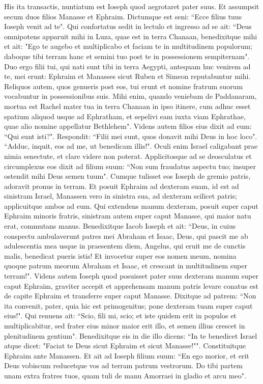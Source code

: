 \begin{biblechapter}  
\verse His ita transactis, nuntiatum est Ioseph quod aegrotaret pater suus. Et assumpsit secum duos filios Manasse et Ephraim. 
\verse Dictumque est seni: “Ecce filius tuus Ioseph venit ad te". Qui confortatus sedit in lectulo 
\verse et ingresso ad se ait: “Deus omnipotens apparuit mihi in Luza, quae est in terra Chanaan, benedixitque mihi 
\verse et ait: "Ego te augebo et multiplicabo et faciam te in multitudinem populorum; daboque tibi terram hanc et semini tuo post te in possessionem sempiternam". 
\verse Duo ergo filii tui, qui nati sunt tibi in terra Aegypti, antequam huc venirem ad te, mei erunt: Ephraim et Manasses sicut Ruben et Simeon reputabuntur mihi. 
\verse Reliquos autem, quos genueris post eos, tui erunt et nomine fratrum suorum vocabuntur in possessionibus suis. 
\verse Mihi enim, quando veniebam de Paddanaram, mortua est Rachel mater tua in terra Chanaan in ipso itinere, cum adhuc esset spatium aliquod usque ad Ephratham, et sepelivi eam iuxta viam Ephrathae, quae alio nomine appellatur Bethlehem". 
\verse Videns autem filios eius dixit ad eum: “Qui sunt isti?". 
\verse Respondit: “Filii mei sunt, quos donavit mihi Deus in hoc loco". “Adduc, inquit, eos ad me, ut benedicam illis!". 
\verse Oculi enim Israel caligabant prae nimia senectute, et clare videre non poterat. Applicitosque ad se deosculatus et circumplexus eos 
\verse dixit ad filium suum: “Non sum fraudatus aspectu tuo; insuper ostendit mihi Deus semen tuum". 
\verse Cumque tulisset eos Ioseph de gremio patris, adoravit pronus in terram. 
\verse Et posuit Ephraim ad dexteram suam, id est ad sinistram Israel, Manassen vero in sinistra sua, ad dexteram scilicet patris; applicuitque ambos ad eum. 
\verse Qui extendens manum dexteram, posuit super caput Ephraim minoris fratris, sinistram autem super caput Manasse, qui maior natu erat, commutans manus. 
\verse Benedixitque Iacob Ioseph et ait: “Deus, in cuius conspectu ambulaverunt patres mei Abraham et Isaac, Deus, qui pascit me ab adulescentia mea usque in praesentem diem, 
\verse Angelus, qui eruit me de cunctis malis, benedicat pueris istis! Et invocetur super eos nomen meum, nomina quoque patrum meorum Abraham et Isaac, et crescant in multitudinem super terram!". 
\verse Videns autem Ioseph quod posuisset pater suus dexteram manum super caput Ephraim, graviter accepit et apprehensam manum patris levare conatus est de capite Ephraim et transferre super caput Manasse. 
\verse Dixitque ad patrem: “Non ita convenit, pater, quia hic est primogenitus; pone dexteram tuam super caput eius!". 
\verse Qui renuens ait: “Scio, fili mi, scio; et iste quidem erit in populos et multiplicabitur, sed frater eius minor maior erit illo, et semen illius crescet in plenitudinem gentium". 
\verse Benedixitque eis in die illo dicens: “In te benedicet Israel atque dicet: "Faciat te Deus sicut Ephraim et sicut Manasse!"". Constituitque Ephraim ante Manassen. 
\verse Et ait ad Ioseph filium suum: “En ego morior, et erit Deus vobiscum reducetque vos ad terram patrum vestrorum.  
\verse Do tibi partem unam extra fratres tuos, quam tuli de manu Amorraei in gladio et arcu meo". 
\end{biblechapter}

